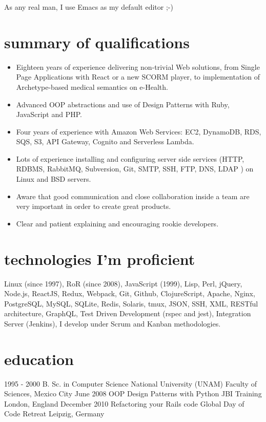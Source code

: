 \documentclass[]{k-cv}
\begin{document}
As any real man, I use Emacs as my default editor ;-)

\section{summary of qualifications}
  \begin{itemize}
    \item Eighteen years of experience delivering non-trivial Web solutions, from Single Page Applications
          with React or a new SCORM player, to implementation of Archetype-based medical semantics on e-Health.
    \item Advanced OOP abstractions and use of Design Patterns with Ruby, JavaScript and PHP.
    \item Four years of experience with Amazon Web Services: EC2, DynamoDB, RDS, SQS, S3, API Gateway, Cognito and Serverless Lambda.
    \item Lots of experience installing and configuring server side services (HTTP,
          RDBMS, RabbitMQ, Subversion, Git, SMTP, SSH, FTP, DNS, LDAP ) on Linux and
          BSD servers.
    \item Aware that good communication and close collaboration inside a team
          are very important in order to create great products.
    \item Clear and patient explaining and encouraging rookie developers.
   \end{itemize}

\section{technologies I'm proficient}

    Linux (since 1997), RoR (since 2008), JavaScript (1999), Lisp, Perl, jQuery, Node.js, ReactJS, Redux, Webpack, Git,
    Github, ClojureScript, Apache, Nginx, PostgreSQL, MySQL, SQLite, Redis, Solaris,
    tmux, JSON, SSH, XML, RESTful architecture, GraphQL, Test Driven Development (rspec and jest),
    Integration Server (Jenkins), I develop under Scrum and Kanban methodologies.


\newpage

\section{education}

\begin{entrylist}
  \entry
    {1995 - 2000}
    {B. Sc. in Computer Science}
    {National University (UNAM)}
	  {Faculty of Sciences, Mexico City}
  \entry
    {June 2008}
    {OOP Design Patterns with Python}
    {JBI Training}
    {London, England}
   \entry
    {December 2010}
    {Refactoring your Rails code}
    {Global Day of Code Retreat}
    {Leipzig, Germany}

\end{entrylist}
\end{document}
